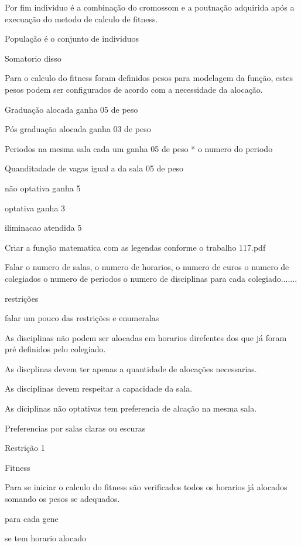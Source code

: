 	Por fim individuo é a combinação do cromossom e a poutnação adquirida após a execuação do metodo de calculo de fitness.

	
	População é o conjunto de individuos



Somatorio disso

Para o calculo do fitness foram definidos pesos para modelagem da função, estes pesos podem ser configurados de acordo com a necessidade da alocação.

Graduação alocada ganha 05 de peso

Pós graduação alocada ganha 03 de peso

Periodos na mesma sala cada um ganha 05 de peso * o numero do periodo

Quanditadade de vagas igual a da sala 05 de peso

não optativa ganha 5

optativa ganha 3

iliminacao atendida 5

Criar a função matematica com as legendas conforme o trabalho 117.pdf

Falar o numero de salas, o numero de horarios, o numero de curos o numero de colegiados o numero de periodos o numero de disciplinas para cada colegiado.......

restrições 


falar um pouco das restrições e enumeralas

As disciplinas não podem ser alocadas em horarios direfentes dos que já foram pré definidos pelo colegiado.

As discplinas devem ter apenas a quantidade de alocações necessarias.

As disciplinas devem respeitar a capacidade da sala.

As diciplinas não optativas tem preferencia de alcação na mesma sala.

Preferencias por salas claras ou escuras

Restrição 1 


Fitness

Para se iniciar o calculo do fitness são verificados todos os horarios já alocados somando os pesos se adequados.

para cada gene

se tem horario alocado 

